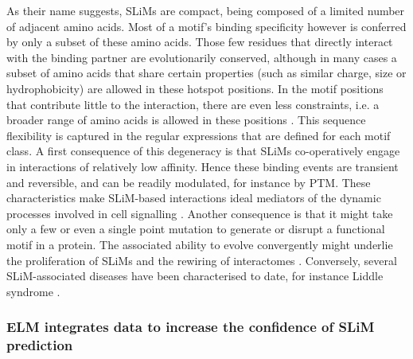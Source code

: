 \documentclass[12pt]{article}
\begin{document}
As their name suggests, SLiMs are compact, being composed of a limited number of
adjacent amino acids. Most of a motif's binding specificity however is conferred
by only a subset of these amino acids. Those few residues that directly interact
with the binding partner are evolutionarily conserved, although in many cases a
subset of amino acids that share certain properties (such as similar charge,
size or hydrophobicity) are allowed in these hotspot positions. In the motif
positions that contribute little to the interaction, there are even less
constraints, i.e. a broader range of amino acids is allowed in these positions
\citep{21909575}. This sequence flexibility is captured in the regular
expressions that are defined for each motif class. A first consequence of this
degeneracy is that SLiMs co-operatively engage in interactions of relatively low
affinity. Hence these binding events are transient and reversible, and can be
readily modulated, for instance by PTM. These characteristics make SLiM-based
interactions ideal mediators of the dynamic processes involved in cell
signalling \citep{22480932}. Another consequence is that it might take only a few
or even a single point mutation to generate or disrupt a functional motif in a
protein. The associated ability to evolve convergently might underlie the
proliferation of SLiMs and the rewiring of interactomes \citep{26589632,
22346764}. Conversely, several SLiM-associated diseases have been
characterised to date, for instance Liddle syndrome \citep{15483078}.

\subsubsection*{ELM integrates data to increase the confidence of SLiM prediction}
\end{document}
